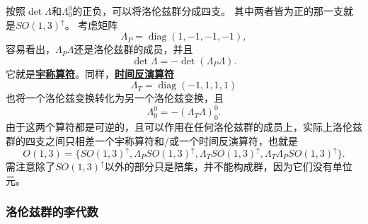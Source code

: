 \documentclass[hyperref, UTF8, a4paper]{ctexart}
\DeclareMathOperator{\diag}{diag}
\newcommand{\concept}[1]{\underline{\textbf{#1}}}
\begin{document}
按照$\det \Lambda$和$\Lambda_0^0$的正负，可以将洛伦兹群分成四支。
其中两者皆为正的那一支就是$SO(1,3)^\uparrow$。
考虑矩阵
\begin{equation}
    \Lambda_P = \diag (1, -1, -1, -1), 
\end{equation}
容易看出，$\Lambda_P \Lambda$还是洛伦兹群的成员，并且
\[
    \det \Lambda = - \det (\Lambda_P \Lambda).
\]
它就是\concept{宇称算符}。同样，\concept{时间反演算符}
\begin{equation}
    \Lambda_T = \diag(-1, 1, 1, 1)
\end{equation}
也将一个洛伦兹变换转化为另一个洛伦兹变换，且
\[
    \Lambda_0^0 = - (\Lambda_T \Lambda)_0^0.
\]
由于这两个算符都是可逆的，且可以作用在任何洛伦兹群的成员上，实际上洛伦兹群的四支之间只相差一个宇称算符和/或一个时间反演算符，也就是
\begin{equation}
    O(1, 3) = \{ SO(1,3)^\uparrow, \Lambda_P SO(1,3)^\uparrow, \Lambda_T SO(1,3)^\uparrow, \Lambda_T \Lambda_P SO(1,3)^\uparrow \}.
    \label{eq:4-parts-of-o13}
\end{equation}
需注意除了$SO(1,3)^\uparrow$以外的部分只是陪集，并不能构成群，因为它们没有单位元。

\subsubsection{洛伦兹群的李代数}
\end{document}
